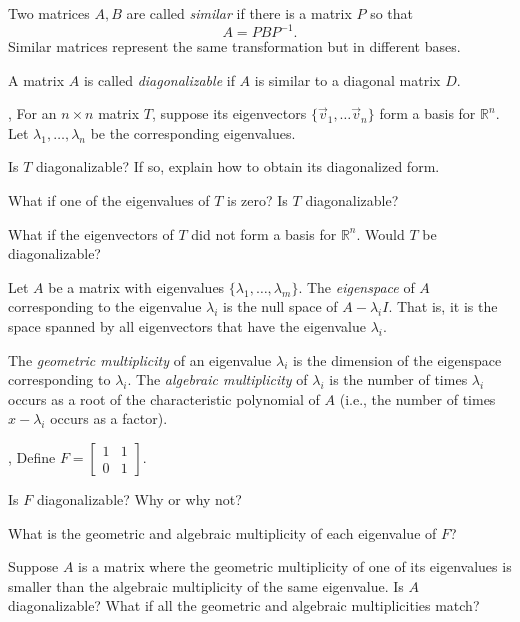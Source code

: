 \documentclass{article}
\newcommand{\R}{\mathbb{R}}
\newcommand{\mat}[1]{\begin{bmatrix}#1\end{bmatrix}}
\begin{document}
	\begin{Def}
	Two matrices $A,B$ are called \emph{similar} if there is a matrix $P$ so that
	\[
		A=PBP^{-1}.
	\]
	Similar matrices represent the same transformation but in different bases.

	A matrix $A$ is called \emph{diagonalizable} if $A$ is similar to 
	a diagonal matrix $D$.
	\end{Def}

	\sep
	For an $n\times n$ matrix $T$, suppose its eigenvectors $\{\vec v_1,\ldots \vec v_n\}$
	form a basis for $\R^n$.  Let $\lambda_1,\ldots,\lambda_n$ be the corresponding
	eigenvalues.
	

	\begin{Enum}
		\item Is $T$ diagonalizable?  If so, explain how to obtain its diagonalized form.
		\item What if one of the eigenvalues of $T$ is zero?  Is $T$ diagonalizable?
		\item What if the eigenvectors of $T$ did not form a basis for $\R^n$.
			Would $T$ be diagonalizable?
	\end{Enum}

	\begin{Def}
	Let $A$ be a matrix with eigenvalues $\{\lambda_1,\ldots,\lambda_m\}$.  The
	\emph{eigenspace} of $A$ corresponding to the eigenvalue $\lambda_i$ is the
	null space of $A-\lambda_i I$.  That is, it is the space spanned by all eigenvectors
	that have the eigenvalue $\lambda_i$.

	The \emph{geometric multiplicity} of an eigenvalue $\lambda_i$ is the dimension
	of the eigenspace corresponding to $\lambda_i$.  The \emph{algebraic multiplicity}
	of $\lambda_i$ is the number of times $\lambda_i$ occurs as a root of the
	characteristic polynomial of $A$ (i.e., the number of times $x-\lambda_i$
	occurs as a factor).
	\end{Def}

	\sep
	Define $F=\mat{1&1\\0&1}$.
	\begin{Enum}
		\item Is $F$ diagonalizable?  Why or why not?
		\item What is the geometric and algebraic multiplicity of each eigenvalue
			of $F$?
		\item Suppose $A$ is a matrix where the geometric multiplicity of one of its eigenvalues
			is smaller than the algebraic multiplicity of the same eigenvalue.  Is
			$A$ diagonalizable?  What if all the geometric and algebraic multiplicities
			match?
	\end{Enum}
\end{document}
